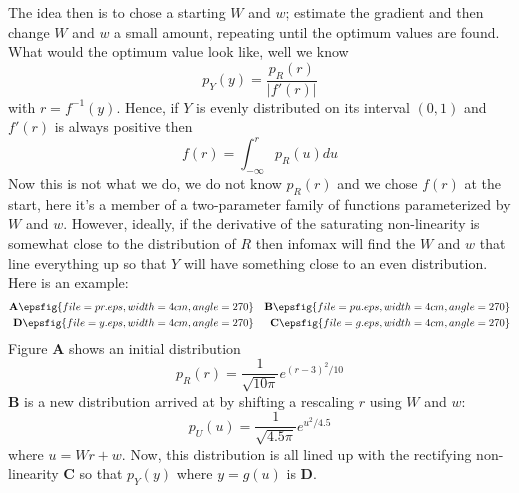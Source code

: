 \documentclass[12pt]{article}
\begin{document}
The idea then is to chose a starting $W$ and $w$; estimate the
gradient and then change $W$ and $w$ a small amount, repeating until
the optimum values are found. What would the optimum value look like, well we know
\begin{equation}
p_Y(y)=\frac{p_R(r)}{|f'(r)|}
\end{equation}
with $r=f^{-1}(y)$. Hence, if $Y$ is evenly distributed on its interval $(0,1)$ and $f'(r)$ is always positive then
\begin{equation}
f(r)=\int_{-\infty}^rp_R(u)du
\end{equation}
Now this is not what we do, we do not know $p_R(r)$ and we chose
$f(r)$ at the start, here it's a member of a two-parameter family of
functions parameterized by $W$ and $w$. However, ideally, if the
derivative of the saturating non-linearity is somewhat close to the
distribution of $R$ then infomax will find the $W$ and $w$ that line
everything up so that $Y$ will have something close to an even
distribution. Here is an example:
\begin{eqnarray*}
\textbf{A}\epsfig{file=pr.eps,width=4cm,angle=270}&&\textbf{B}\epsfig{file=pu.eps,width=4cm,angle=270}\cr
\textbf{D}\epsfig{file=y.eps,width=4cm,angle=270}&&\textbf{C}\epsfig{file=g.eps,width=4cm,angle=270}
\end{eqnarray*}
Figure \textbf{A} shows an initial distribution 
\begin{equation}
p_R(r)=\frac{1}{\sqrt{10\pi}}e^{(r-3)^2/10}
\end{equation}
\textbf{B} is a new distribution arrived at by shifting a rescaling $r$ using $W$ and $w$:
\begin{equation}
p_U(u)=\frac{1}{\sqrt{4.5\pi}}e^{u^2/4.5}
\end{equation}
where $u=Wr+w$. Now, this distribution is all lined up with the
rectifying non-linearity \textbf{C} so that $p_Y(y)$ where $y=g(u)$ is \textbf{D}.
\end{document}
